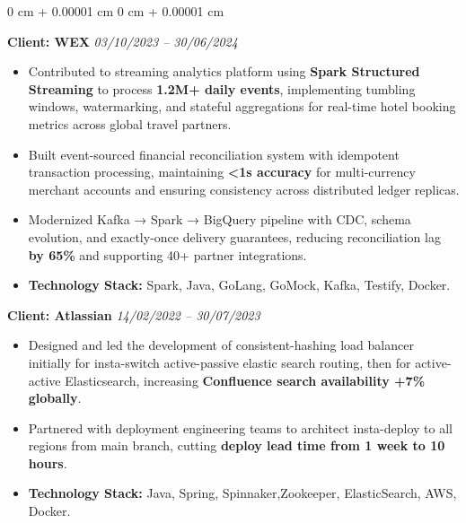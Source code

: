 \documentclass[10pt, letterpaper]{article}
\newenvironment{onecolentry}{
    \begin{adjustwidth}{
        0 cm + 0.00001 cm
    }{
        0 cm + 0.00001 cm
    }
}{
    \end{adjustwidth}
} %
\begin{document}
\begin{onecolentry}
            \vspace{0.10 cm}
            \hspace{0.5cm}\textbf{Client: WEX} \hfill \textit{03/10/2023 -- 30/06/2024}
            \begin{itemize}[
                topsep=0.10 cm,
                parsep=0.10 cm,
                partopsep=0pt,
                itemsep=0pt,
                leftmargin=0 cm + 10pt + 0.5cm
            ]
            \item Contributed to streaming analytics platform using \textbf{Spark Structured Streaming} to process \textbf{1.2M+ daily events}, implementing tumbling windows, watermarking, and stateful aggregations for real-time hotel booking metrics across global travel partners.
            \item Built event-sourced financial reconciliation system with idempotent transaction processing, maintaining \textbf{<1s accuracy} for multi-currency merchant accounts and ensuring consistency across distributed ledger replicas.
            \item Modernized Kafka → Spark → BigQuery pipeline with CDC, schema evolution, and exactly-once delivery guarantees, reducing reconciliation lag \textbf{by 65\%} and supporting 40+ partner integrations.
            \item \textbf{Technology Stack:} Spark, Java, GoLang, GoMock, Kafka, Testify, Docker.
            \end{itemize}

            \vspace{0.10 cm}
            \hspace{0.5cm}\textbf{Client: Atlassian} \hfill \textit{14/02/2022 -- 30/07/2023}
            \begin{itemize}[
                topsep=0.10 cm,
                parsep=0.10 cm,
                partopsep=0pt,
                itemsep=0pt,
                leftmargin=0 cm + 10pt + 0.5cm
            ]
                \item Designed and led the development of consistent-hashing load balancer initially for insta-switch active-passive elastic search routing, then for active-active Elasticsearch, increasing \textbf{Confluence search availability +7\% globally}.
                \item Partnered with deployment engineering teams to architect insta-deploy to all regions from main branch, cutting \textbf{deploy lead time from 1 week to 10 hours}.
                \item \textbf{Technology Stack:} Java, Spring, Spinnaker,Zookeeper, ElasticSearch, AWS, Docker.
            \end{itemize}
        \end{onecolentry}
\end{document}
